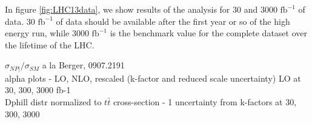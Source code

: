 \documentclass[preprint]{JHEP3} %
\def\invfb {\mathrm{fb}^{-1}}
\begin{document}
In figure \ref{fig:LHC13data}, we show results of the analysis for 30 and 3000 $\invfb$ of data. 30 $\invfb$ of data should be available after 
the first year or so of the high energy run, while 3000 $\invfb$ is the benchmark value for the complete dataset over the lifetime of the LHC. 

$\sigma_{NP|} / \sigma_{SM}$ a la Berger, 0907.2191 \\

alpha plots - LO, NLO, rescaled (k-factor and reduced scale uncertainty) LO at 30, 300, 3000 fb-1\\
Dphill distr normalized to $t\bar{t}$ cross-section  - 1 uncertainty from k-factors at 30, 300, 3000\\
\end{document}
